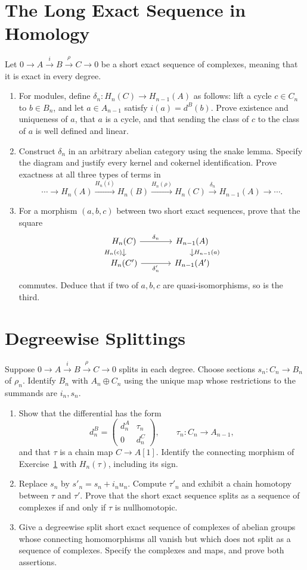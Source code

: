 \documentclass[11pt]{article}
\begin{document}
\section{The Long Exact Sequence in Homology}\label{ex:les}
Let $0\to A\xrightarrow{i}B\xrightarrow{\rho}C\to0$ be a short exact sequence of complexes, meaning that it is exact in every degree.
\begin{enumerate}
\item For modules, define $\delta_n:H_n(C)\to H_{n-1}(A)$ as follows: lift a cycle $c\in C_n$ to $b\in B_n$, and let $a\in A_{n-1}$ satisfy $i(a)=d^B(b)$. Prove existence and uniqueness of $a$, that $a$ is a cycle, and that sending the class of $c$ to the class of $a$ is well defined and linear.
\item Construct $\delta_n$ in an arbitrary abelian category using the snake lemma. Specify the diagram and justify every kernel and cokernel identification. Prove exactness at all three types of terms in
\[
\cdots\to H_n(A)\xrightarrow{H_n(i)}H_n(B)\xrightarrow{H_n(\rho)}H_n(C)
\xrightarrow{\delta_n}H_{n-1}(A)\to\cdots.
\]
\item For a morphism $(a,b,c)$ between two short exact sequences, prove that the square
\[
\begin{tikzcd}[row sep=small,column sep=large]
H_n(C)\arrow[r,"\delta_n"]\arrow[d,"H_n(c)"']&H_{n-1}(A)\arrow[d,"H_{n-1}(a)"]\\
H_n(C')\arrow[r,"\delta'_n"']&H_{n-1}(A')
\end{tikzcd}
\]
commutes. Deduce that if two of $a,b,c$ are quasi-isomorphisms, so is the third.
\end{enumerate}


\section{Degreewise Splittings}\label{ex:split}
Suppose $0\to A\xrightarrow{i}B\xrightarrow{\rho}C\to0$ splits in each degree. Choose sections $s_n:C_n\to B_n$ of $\rho_n$. Identify $B_n$ with $A_n\oplus C_n$ using the unique map whose restrictions to the summands are $i_n,s_n$.
\begin{enumerate}
\item Show that the differential has the form
\[
d^B_n=\begin{pmatrix}d^A_n&\tau_n\\0&d^C_n\end{pmatrix},
\qquad \tau_n:C_n\to A_{n-1},
\]
and that $\tau$ is a chain map $C\to A[1]$. Identify the connecting morphism of Exercise~\ref{ex:les} with $H_n(\tau)$, including its sign.
\item Replace $s_n$ by $s'_n=s_n+i_nu_n$. Compute $\tau'_n$ and exhibit a chain homotopy between $\tau$ and $\tau'$. Prove that the short exact sequence splits as a sequence of complexes if and only if $\tau$ is nullhomotopic.
\item Give a degreewise split short exact sequence of complexes of abelian groups whose connecting homomorphisms all vanish but which does not split as a sequence of complexes. Specify the complexes and maps, and prove both assertions.
\end{enumerate}
\end{document}
